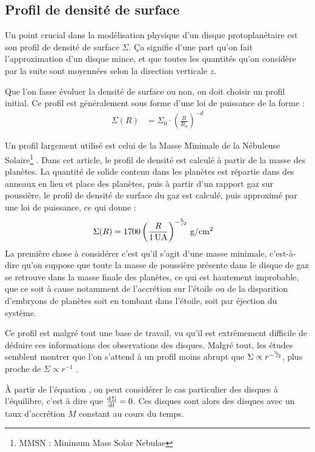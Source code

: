 \subsection{Profil de densité de surface}
Un point crucial dans la modélisation physique d'un disque protoplanétaire est son profil de densité de surface $\Sigma$. Ça signifie d'une part qu'on fait l'approximation d'un disque mince, et que toutes les quantités qu'on considère par la suite sont moyennées selon la direction verticale $z$.

Que l'on fasse évoluer la densité de surface ou non, on doit choisir un profil initial. Ce profil est généralement sous forme d'une loi de puissance de la forme : 
\begin{align}
\Sigma(R) &= \Sigma_0 \cdot \left(\frac{R}{R_0}\right)^{-d}
\end{align}

Un profil largement utilisé est celui de la Masse Minimale de la Nébuleuse Solaire\footnote{MMSN : Minimum Mass Solar Nebulae} \citep{weidenschilling1977distribution, hayashi1981structure}. Dans cet article, le profil de densité est calculé à partir de la masse des planètes. La quantité de solide contenu dans les planètes est répartie dans des anneaux en lieu et place des planètes, puis à partir d'un rapport gaz sur poussière, le profil de densité de surface du gaz est calculé, puis approximé par une loi de puissance, ce qui donne : 
\begin{align}
\Sigma(R) &= 1700 \left(\frac{R}{1\mathrm{\thinspace UA}}\right)^{-{{}^{3\!\!}/ _{\!2}}} \mathrm{\thinspace g/cm^2}
\end{align}
La première chose à considérer c'est qu'il s'agit d'une masse minimale, c'est-à-dire qu'on suppose que toute
la masse de poussière présente dans le disque de gaz se retrouve dans la masse finale des planètes, ce qui est hautement
improbable, que ce soit à cause notamment de l'accrétion sur l'étoile ou de la disparition d'embryons de planètes soit en
tombant dans l'étoile, soit par éjection du système.

Ce profil est malgré tout une base de travail, vu qu'il est extrêmement difficile de déduire ces informations des observations des disques. Malgré tout, les études semblent montrer que l'on s'attend à un profil moins abrupt que $\Sigma\propto r^{-{{}^{3\!\!}/ _{\!2}}}$, plus proche de $\Sigma\propto r^{-1}$ \citep{bell1997structure}.

À partir de l'équation , on peut considérer le cas particulier des disques à l'équilibre, c'est à dire que $\od{\Sigma}{t}=0$. Ces disques sont alors des disques avec un taux d'accrétion $\dot{M}$ constant au cours du temps. 

